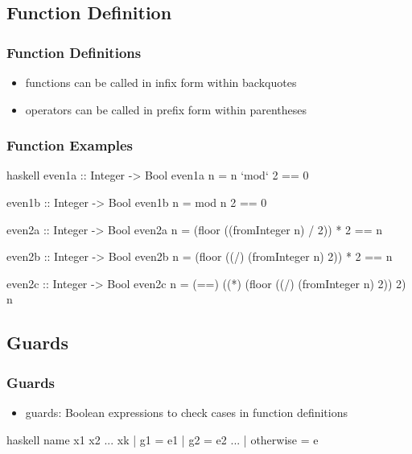 \documentclass[dvipsnames]{beamer}
\theoremstyle{plain}
\begin{document}
\subsection{Function Definition}

\begin{frame}[fragile]
  \frametitle{Function Definitions}

  \begin{itemize}
    \item functions can be called in infix form within backquotes
    \item operators can be called in prefix form within parentheses
  \end{itemize}
\end{frame}

\begin{frame}[fragile]
  \frametitle{Function Examples}

  \begin{exampleblock}{}
    \begin{pygments}{haskell}
even1a :: Integer -> Bool
even1a n = n `mod` 2 == 0

even1b :: Integer -> Bool
even1b n = mod n 2 == 0

even2a :: Integer -> Bool
even2a n = (floor ((fromInteger n) / 2)) * 2 == n

even2b :: Integer -> Bool
even2b n = (floor ((/) (fromInteger n) 2)) * 2 == n

even2c :: Integer -> Bool
even2c n =
    (==) ((*) (floor ((/) (fromInteger n) 2)) 2) n
    \end{pygments}
  \end{exampleblock}
\end{frame}

\subsection{Guards}

\begin{frame}[fragile]
  \frametitle{Guards}

  \begin{itemize}
    \item \alert{guards}: Boolean expressions to check cases
      in function definitions
  \end{itemize}

  \begin{block}{}
    \begin{pygments}{haskell}
name x1 x2 ... xk
  | g1        = e1
  | g2        = e2
    ...
  | otherwise = e
    \end{pygments}
  \end{block}
\end{frame}
\end{document}
